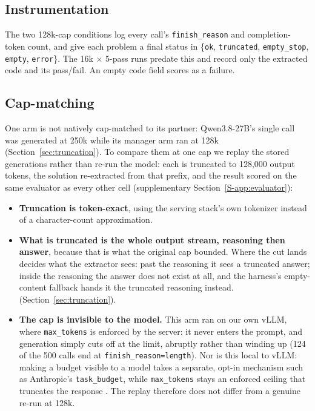 \documentclass[journal]{IEEEtran}
\begin{document}
\subsection{Instrumentation} The two 128k-cap conditions log every call's \texttt{finish\_reason}
and completion-token count, and give each problem a final status in \{\texttt{ok},
\texttt{truncated}, \texttt{empty\_stop}, \texttt{empty}, \texttt{error}\}. The 16k $\times$ 5-pass
runs predate this and record only the extracted code and its pass/fail. An empty code field scores
as a failure.

\subsection{Cap-matching} One arm is not natively cap-matched to its partner: Qwen3.8-27B's single
call was generated at 250k while its manager arm ran at 128k (Section~\ref{sec:truncation}). To
compare them at one cap we replay the stored generations rather than re-run the model: each is
truncated to 128,000 output tokens, the solution re-extracted from that prefix, and the result
scored on the same evaluator as every other cell (supplementary Section~\ref{S-app:evaluator}): 

\begin{itemize}
  \item \textbf{Truncation is token-exact}, using the serving stack's own tokenizer instead of a
  character-count approximation.

  \item \textbf{What is truncated is the whole output stream, reasoning then answer}, because that
  is what the original cap bounded. Where the cut lands decides what the extractor sees: past the
  reasoning it sees a truncated answer; inside the reasoning the answer does not exist at all, and
  the harness's empty-content fallback hands it the truncated reasoning instead. (Section~\ref{sec:truncation}).

  \item \textbf{The cap is invisible to the model.} This arm
  ran on our own vLLM, where \texttt{max\_tokens} is enforced by the server: it never enters the
  prompt, and generation simply cuts off at the limit, abruptly rather than winding up (124 of the
  500 calls end at \texttt{finish\_reason=length}). Nor is this local to vLLM: making a
  budget visible to a model takes a separate, opt-in mechanism such as Anthropic's
  \texttt{task\_budget}, while \texttt{max\_tokens} stays an enforced ceiling that truncates the
  response \cite{anthropic2026effort}. The replay therefore does not differ from a genuine re-run
  at 128k.
\end{itemize}
\end{document}
